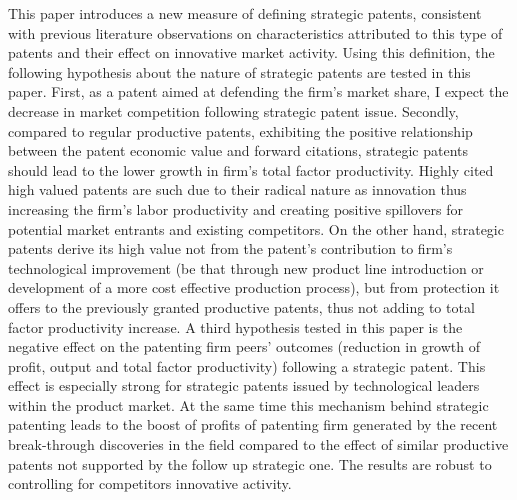 \documentclass[11pt]{article}
\begin{document}
This paper introduces a new measure of defining strategic patents, consistent with previous literature observations on characteristics attributed to this type of patents and their effect on innovative market activity. Using this definition, the following hypothesis about the nature of strategic patents are tested in this paper. First, as a patent aimed at defending the firm's market share, I expect the decrease in market competition following strategic patent issue. Secondly, compared to regular productive patents, exhibiting the positive relationship between the patent economic value and forward citations, strategic patents should lead to the lower growth in firm's total factor productivity. Highly cited high valued patents are such due to their radical nature as innovation thus increasing the firm's labor productivity and creating positive spillovers for potential market entrants and existing competitors. On the other hand, strategic patents derive its high value not from the patent's contribution to firm's technological improvement (be that through new product line introduction or development of a more cost effective production process), but from protection it offers to the previously granted productive patents, thus not adding to total factor productivity increase. A third hypothesis tested in this paper is the negative effect on the patenting firm peers' outcomes (reduction in growth of profit, output and total factor productivity) following a strategic patent. This effect is especially strong for strategic patents issued by technological leaders within the product market. At the same time this mechanism behind strategic patenting leads to the boost of profits of patenting firm generated by the recent break-through discoveries in the field compared to the effect of similar productive patents not supported by the follow up strategic one. The results are robust to controlling for competitors innovative activity. 
\end{document}
